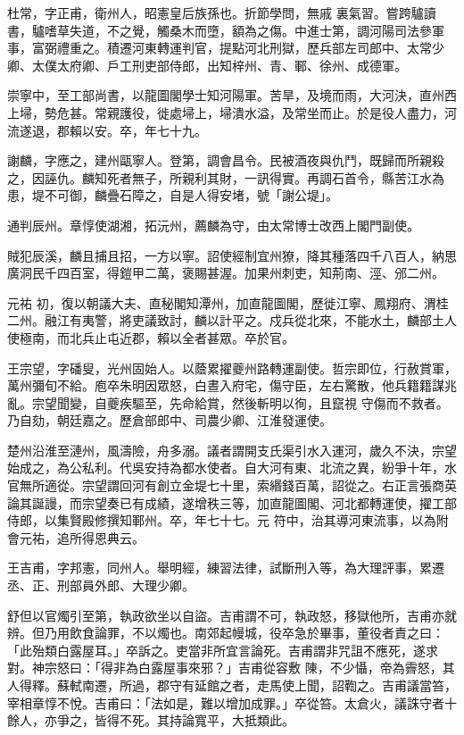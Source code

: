 \begin{pinyinscope}
 杜常，字正甫，衛州人，昭憲皇后族孫也。折節學問，無戚
 裏氣習。嘗跨驢讀書，驢嗜草失道，不之覺，觸桑木而墮，額為之傷。中進士第，調河陽司法參軍事，富弼禮重之。積遷河東轉運判官，提點河北刑獄，歷兵部左司郎中、太常少卿、太僕太府卿、戶工刑吏部侍郎，出知梓州、青、鄆、徐州、成德軍。



 崇寧中，至工部尚書，以龍圖閣學士知河陽軍。苦旱，及境而雨，大河決，直州西上埽，勢危甚。常親護役，徙處埽上，埽潰水溢，及常坐而止。於是役人盡力，河流遂退，郡賴以安。卒，年七十九。



 謝麟，字應之，建州甌寧人。登第，調會昌令。民被酒夜與仇鬥，既歸而所親殺之，因誣仇。麟知死者無子，所親利其財，一訊得實。再調石首令，縣苦江水為患，堤不可御，麟疊石障之，自是人得安堵，號「謝公堤」。



 通判辰州。章惇使湖湘，拓沅州，薦麟為守，由太常博士改西上閣門副使。



 賊犯辰溪，麟且捕且招，一方以寧。詔使經制宜州獠，降其種落四千八百人，納思廣洞民千四百室，得鎧甲二萬，褒賜甚渥。加果州刺吏，知荊南、涇、邠二州。



 元祐
 初，復以朝議大夫、直秘閣知潭州，加直龍圖閣，歷徙江寧、鳳翔府、渭桂二州。融江有夷警，將吏議致討，麟以計平之。戍兵從北來，不能水土，麟部土人使極南，而北兵止屯近郡，賴以全者甚眾。卒於官。



 王宗望，字磻叟，光州固始人。以蔭累擢夔州路轉運副使。哲宗即位，行赦賞軍，萬州彌旬不給。庖卒朱明因眾怒，白晝入府宅，傷守臣，左右驚散，他兵籍籍謀兆亂。宗望聞變，自夔疾驅至，先命給賞，然後斬明以徇，且竄視
 守傷而不救者。乃自劾，朝廷嘉之。歷倉部郎中、司農少卿、江淮發運使。



 楚州沿淮至漣州，風濤險，舟多溺。議者謂開支氏渠引水入運河，歲久不決，宗望始成之，為公私利。代吳安持為都水使者。自大河有東、北流之異，紛爭十年，水官無所適從。宗望謂回河有創立金堤七十里，索緡錢百萬，詔從之。右正言張商英論其誕謾，而宗望奏已有成績，遂增秩三等，加直龍圖閣、河北都轉運使，擢工部侍郎，以集賢殿修撰知鄆州。卒，年七十七。元
 符中，治其導河東流事，以為附會元祐，追所得恩典云。



 王吉甫，字邦憲，同州人。舉明經，練習法律，試斷刑入等，為大理評事，累遷丞、正、刑部員外郎、大理少卿。



 舒但以官燭引至第，執政欲坐以自盜。吉甫謂不可，執政怒，移獄他所，吉甫亦就辨。但乃用飲食論罪，不以燭也。南郊起幔城，役卒急於畢事，董役者責之曰：「此殆類白露屋耳。」卒訴之。吏當非所宜言論死。吉甫謂非咒詛不應死，遂求對。神宗怒曰：「得非為白露屋事來邪？」吉甫從容敷
 陳，不少懾，帝為霽怒，其人得釋。蘇軾南遷，所過，郡守有延館之者，走馬使上聞，詔鞫之。吉甫議當笞，宰相章惇不悅。吉甫曰：「法如是，難以增加成罪。」卒從笞。太倉火，議誅守者十餘人，亦爭之，皆得不死。其持論寬平，大抵類此。




\end{pinyinscope}
